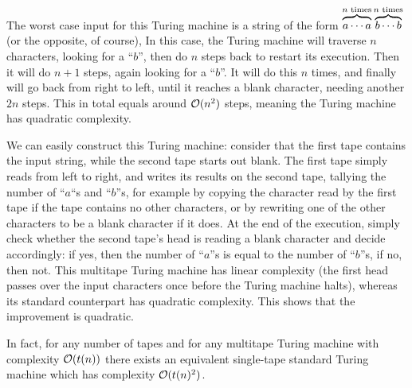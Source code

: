 \begin{solution}
	The worst case input for this Turing machine
	is a string of the form \(\overbrace{a \cdots\vphantom{b} a}^{n \textnormal{ times}}\overbrace{b \cdots b}^{n \textnormal{ times}}\)
	(or the opposite, of course),
	In this case, the Turing machine will traverse \(n\) characters,
	looking for a ``\(b\)'',
	then do \(n\) steps back to restart its execution.
	Then it will do \(n+1\) steps, again looking for a ``\(b\)''.
	It will do this \(n\) times,
	and finally will go back from right to left,
	until it reaches a blank character, needing another \(2n\) steps.
	This in total equals around \(\mathcal{O}(n^2)\) steps,
	meaning the Turing machine has quadratic complexity.

	We can easily construct this Turing machine:
	consider that the first tape contains the input string,
	while the second tape starts out blank.
	The first tape simply reads from left to right,
	and writes its results on the second tape,
	tallying the number of ``\(a\)``s and ``\(b\)''s,
	for example by copying the character read by the first tape
	if the tape contains no other characters,
	or by rewriting one of the other characters
	to be a blank character if it does.
	At the end of the execution, simply check whether the second tape's head
	is reading a blank character and decide accordingly:
	if yes, then the number of ``\(a\)''s
	is equal to the number of ``\(b\)''s,
	if no, then not.
	This multitape Turing machine has linear complexity
	(the first head passes over the input characters once
	before the Turing machine halts),
	whereas its standard counterpart has quadratic complexity.
	This shows that the improvement is quadratic.

	In fact, for any number of tapes and for any multitape Turing machine
	with complexity \(\mathcal{O}(t(n))\)
	there exists an equivalent single-tape standard Turing machine
	which has complexity \(\mathcal{O}(t(n)^2)\).
\end{solution}
